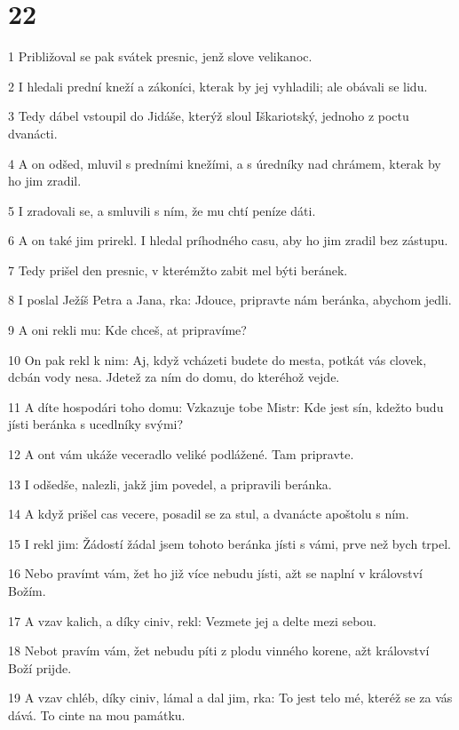 \chapter{22}

\par 1 Približoval se pak svátek presnic, jenž slove velikanoc.
\par 2 I hledali prední kneží a zákoníci, kterak by jej vyhladili; ale obávali se lidu.
\par 3 Tedy dábel vstoupil do Jidáše, kterýž sloul Iškariotský, jednoho z poctu dvanácti.
\par 4 A on odšed, mluvil s predními knežími, a s úredníky nad chrámem, kterak by ho jim zradil.
\par 5 I zradovali se, a smluvili s ním, že mu chtí peníze dáti.
\par 6 A on také jim prirekl. I hledal príhodného casu, aby ho jim zradil bez zástupu.
\par 7 Tedy prišel den presnic, v kterémžto zabit mel býti beránek.
\par 8 I poslal Ježíš Petra a Jana, rka: Jdouce, pripravte nám beránka, abychom jedli.
\par 9 A oni rekli mu: Kde chceš, at pripravíme?
\par 10 On pak rekl k nim: Aj, když vcházeti budete do mesta, potkát vás clovek, dcbán vody nesa. Jdetež za ním do domu, do kteréhož vejde.
\par 11 A díte hospodári toho domu: Vzkazuje tobe Mistr: Kde jest sín, kdežto budu jísti beránka s ucedlníky svými?
\par 12 A ont vám ukáže veceradlo veliké podlážené. Tam pripravte.
\par 13 I odšedše, nalezli, jakž jim povedel, a pripravili beránka.
\par 14 A když prišel cas vecere, posadil se za stul, a dvanácte apoštolu s ním.
\par 15 I rekl jim: Žádostí žádal jsem tohoto beránka jísti s vámi, prve než bych trpel.
\par 16 Nebo pravímt vám, žet ho již více nebudu jísti, ažt se naplní v království Božím.
\par 17 A vzav kalich, a díky ciniv, rekl: Vezmete jej a delte mezi sebou.
\par 18 Nebot pravím vám, žet nebudu píti z plodu vinného korene, ažt království Boží prijde.
\par 19 A vzav chléb, díky ciniv, lámal a dal jim, rka: To jest telo mé, kteréž se za vás dává. To cinte na mou památku.
